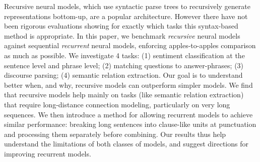 Recursive neural models, which use syntactic parse trees to recursively generate representations bottom-up, are a popular architecture. However there have not been rigorous evaluations showing for exactly which tasks this syntax-based method is appropriate. In this paper, we benchmark {\it recursive} neural models against sequential {\it recurrent} neural models, enforcing apples-to-apples comparison as much as possible. We investigate 4 tasks: (1) sentiment classification at the sentence level and phrase level; (2) matching questions to answer-phrases; (3) discourse parsing; (4) semantic relation extraction. Our goal is to understand better when, and why, recursive models can outperform simpler models. We find that recursive models help mainly on tasks (like semantic relation extraction) that require long-distance connection modeling, particularly on very long sequences. We then introduce a method for allowing recurrent models to achieve similar performance: breaking long sentences into  clause-like units at punctuation and processing them separately before combining. Our results thus help understand the limitations of both classes of models, and suggest directions for improving recurrent models.
